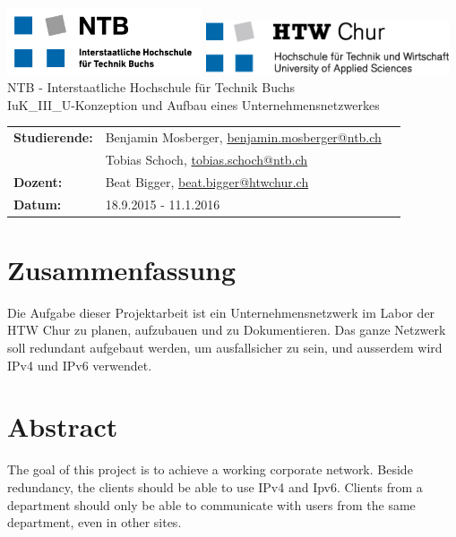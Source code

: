 \documentclass[11pt,a4paper]{scrreprt}
\begin{document}
\thispagestyle{empty}
\begin{center}
	\includegraphics[height=2cm]{logo_ntb.png}
	\hspace*{6cm}
	\includegraphics[height=1.6cm]{logo_htw.png}\\
	\vspace{5cm}
	\Large{NTB - Interstaatliche Hochschule für Technik Buchs}\\
	\vspace{3cm}
	\Huge{IuK\_III\_U-Konzeption und Aufbau eines Unternehmensnetzwerkes}\\
	\vspace{6cm}
	\Large{}
	\doublespacing
	\begin{tabular}{lll}
		\textbf{Studierende:} & Benjamin Mosberger, \href{mailto:benjamin.mosberger@ntb.ch} {benjamin.mosberger@ntb.ch}\\ 
		& Tobias Schoch, \href{mailto:tobias.schoch@ntb.ch} {tobias.schoch@ntb.ch}\\
		\textbf{Dozent:} & Beat Bigger, \href{mailto: beat.bigger@htwchur.ch}{beat.bigger@htwchur.ch} \\
		\textbf{Datum:} & 18.9.2015 - 11.1.2016
	\end{tabular}	
\end{center}
\restoregeometry
\pagebreak

\setcounter{page}{1}
\onehalfspacing 

\section*{Zusammenfassung}
Die Aufgabe dieser Projektarbeit ist ein Unternehmensnetzwerk im Labor der HTW Chur zu planen, aufzubauen und zu Dokumentieren. Das ganze Netzwerk soll redundant aufgebaut werden, um ausfallsicher zu sein, und ausserdem wird IPv4 und IPv6 verwendet.


\vspace{5cm}

\section*{Abstract}
The goal of this project is to achieve a working corporate network. Beside redundancy, the clients should be able to use IPv4 and Ipv6. Clients from a department should only be able to communicate with users from the same department, even in other sites.
\end{document}
